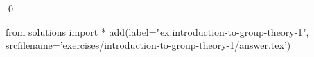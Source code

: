 
    \begin{ex}
  \label{ex:introduction-to-group-theory-1}
  
  \qed
\end{ex}
\begin{python0}
from solutions import *
add(label="ex:introduction-to-group-theory-1",
    srcfilename='exercises/introduction-to-group-theory-1/answer.tex') 
\end{python0}                              
